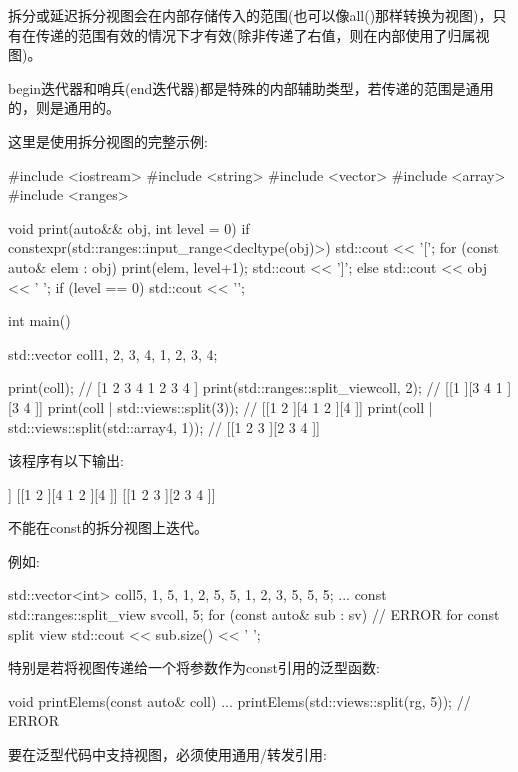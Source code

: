 拆分或延迟拆分视图会在内部存储传入的范围(也可以像all()那样转换为视图)，只有在传递的范围有效的情况下才有效(除非传递了右值，则在内部使用了归属视图)。

begin迭代器和哨兵(end迭代器)都是特殊的内部辅助类型，若传递的范围是通用的，则是通用的。

这里是使用拆分视图的完整示例:


\begin{cpp}
#include <iostream>
#include <string>
#include <vector>
#include <array>
#include <ranges>

void print(auto&& obj, int level = 0)
{
	if constexpr(std::ranges::input_range<decltype(obj)>) {
		std::cout << '[';
		for (const auto& elem : obj) {
			print(elem, level+1);
		}
		std::cout << ']';
	}
	else {
		std::cout << obj << ' ';
	}
	if (level == 0) std::cout << '\n';
}

int main()
{
	std::vector coll{1, 2, 3, 4, 1, 2, 3, 4};
	
	print(coll); // [1 2 3 4 1 2 3 4 ]
	print(std::ranges::split_view{coll, 2}); // [[1 ][3 4 1 ][3 4 ]]
	print(coll | std::views::split(3)); // [[1 2 ][4 1 2 ][4 ]]
	print(coll | std::views::split(std::array{4, 1})); // [[1 2 3 ][2 3 4 ]]
}
\end{cpp}

该程序有以下输出:

\begin{shell}
[1 2 3 4 1 2 3 4 ]
[[1 ][3 4 1 ][3 4 ]]
[[1 2 ][4 1 2 ][4 ]]
[[1 2 3 ][2 3 4 ]]
\end{shell}


不能在const的拆分视图上迭代。

例如:

\begin{cpp}
std::vector<int> coll{5, 1, 5, 1, 2, 5, 5, 1, 2, 3, 5, 5, 5};
...
const std::ranges::split_view sv{coll, 5};
for (const auto& sub : sv) { // ERROR for const split view
	std::cout << sub.size() << ' ';
}
\end{cpp}

特别是若将视图传递给一个将参数作为const引用的泛型函数:

\begin{cpp}
void printElems(const auto& coll) {
	...
}
printElems(std::views::split(rg, 5)); // ERROR
\end{cpp}

要在泛型代码中支持视图，必须使用通用/转发引用:

